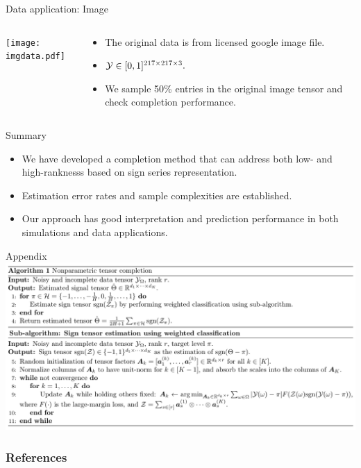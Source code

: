 \documentclass[10pt, mathserif]{beamer} %
\theoremstyle{definition}
\theoremstyle{plain}
\begin{document}
\begin{frame}{Data application: Image}
 \begin{columns}
\begin{column}{0.20\textwidth}
   \begin{center}
     \texttt{[image: imgdata.pdf]}
     \end{center}
\end{column}
\begin{column}{0.7\textwidth} 
\begin{itemize}
    \item The original data is from licensed google image file.
    \item  $\mathcal{Y}\in[0,1]^{217\times217\times3}.$ 
    \item We sample 50\% entries in the original image tensor and check completion performance.
\end{itemize}
\end{column}
\end{columns}
\end{frame}

\begin{frame}{Summary}
\begin{itemize}
    \item We have developed a completion method that can address {\color{red} both low- and high-ranknesss}  based on {\color{red}sign series representation}.
    \item {\color{red}Estimation error rates }and {\color{red}sample complexities} are established.
    \item Our approach has good interpretation and prediction performance in both simulations and data applications.
\end{itemize}
    
\end{frame}



\appendix
\begin{frame}{Appendix}
    \includegraphics[width = \textwidth]{algorithm.pdf}
\end{frame}

\begin{frame}[allowframebreaks]
        \frametitle{References}
 

\end{frame}
\end{document}

